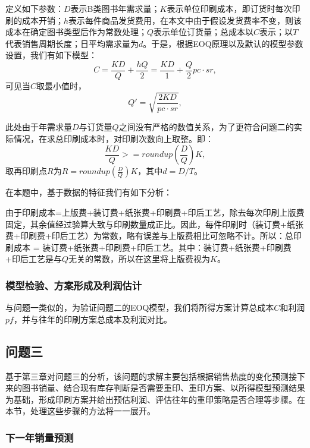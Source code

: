 \documentclass[bwprint]{gmcmthesis}
\begin{document}
定义如下参数：$D$表示B类图书年需求量；$K$表示单位印刷成本，即订货时每次印刷的成本开销；$h$表示每件商品发货费用，在本文中由于假设发货费率不变，则该成本在确定图书类型后作为常数处理；$Q$表示单位订货量；总成本以$C$表示；以$T$代表销售周期长度；日平均需求量为$d$。于是，根据EOQ原理以及默认的模型参数设置，我们有如下模型：
\begin{equation}
\label{eq:eoq}
 C = \frac{KD}{Q} + \frac{hQ}{2} = \frac{KD}{1} + \frac{Q}{2}pc\cdot sr,
\end{equation}
可见当$C$取最小值时，
\begin{equation}
\label{eq:eoq-q}
 Q' = \sqrt{\frac{2KD}{pc\cdot sr}},
\end{equation}

此处由于年需求量$D$与订货量$Q$之间没有严格的数值关系，为了更符合问题二的实际情况，在求总印刷成本时，对印刷次数向上取整。即：
\begin{equation}
\label{eq:kd/q}
 \frac{KD}{Q} >= roundup(\frac{D}{Q})K,
\end{equation}
取再印刷点$R$为$R = roundup(\frac{D}{Q})K$，其中$d=D/T$。

在本题中，基于数据的特征我们有如下分析：

由于印刷成本=上版费+装订费+纸张费+印刷费+印后工艺，除去每次印刷上版费固定，其余值经过验算大致与印刷数量成正比。因此，每件印刷时（装订费+纸张费+印刷费+印后工艺）为常数，略有误差与上版费相比可忽略不计。所以：总印刷成本 =  装订费+纸张费+印刷费+印后工艺。其中：装订费+纸张费+印刷费+印后工艺是与$Q$无关的常数，所以在这里将上版费视为$K$。

\subsubsection{模型检验、方案形成及利润估计}

与问题一类似的，为验证问题二的EOQ模型，我们将所得方案计算总成本$C$和利润$pf$，并与往年的印刷方案总成本及利润对比。

\subsection{问题三}

基于第三章对问题三的分析，该问题的求解主要包括根据销售热度的变化预测接下来的图书销量、结合现有库存判断是否需要重印、重印方案、以所得模型预测结果为基础，形成印刷方案并给出预估利润、评估往年的重印策略是否合理等步骤。在本节，处理这些步骤的方法将一一展开。

\subsubsection{下一年销量预测}
\end{document}
